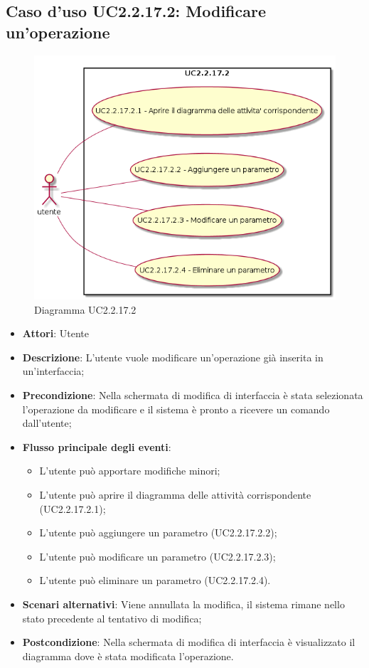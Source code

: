 \documentclass[../AnalisiDeiRequisiti.tex]{subfiles}
\begin{document}
				\subsection{Caso d'uso UC2.2.17.2: Modificare un'operazione}
				\begin{figure} [H]
					\centering
					\includegraphics[scale=0.45]{./Figures/UC2.2.17.2.png}
					\caption{Diagramma UC2.2.17.2}\label{}
				\end{figure}
				\begin{itemize}
					\item \textbf{Attori}: Utente
					\item \textbf{Descrizione}: L'utente vuole modificare un'operazione già inserita in un'interfaccia;
					\item \textbf{Precondizione}: Nella schermata di modifica di interfaccia è stata selezionata l'operazione da modificare e il sistema è pronto a ricevere un comando dall'utente;
					\item \textbf{Flusso principale degli eventi}: \begin{itemize}
						\item L'utente può apportare modifiche minori;
						\item L'utente può aprire il diagramma delle attività corrispondente (UC2.2.17.2.1);
						\item L'utente può aggiungere un parametro (UC2.2.17.2.2);
						\item L'utente può modificare un parametro (UC2.2.17.2.3);
						\item L'utente può eliminare un parametro (UC2.2.17.2.4).
					\end{itemize}
					\item \textbf{Scenari alternativi}: Viene annullata la modifica, il sistema rimane nello stato precedente al tentativo di modifica;
					\item \textbf{Postcondizione}: Nella schermata di modifica di interfaccia è visualizzato il diagramma dove è stata modificata l'operazione.
				\end{itemize}
\end{document}
